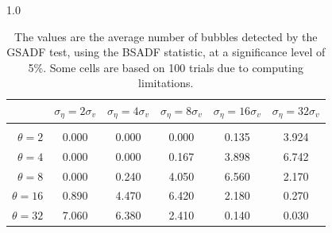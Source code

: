 \documentclass[12pt]{article}
\begin{document}
\begin{table}[h!]
\vspace{10pt}
\begin{subtable}{1.0\textwidth}
    \centering
\begin{tabular}{rccccc}
\hline  
            & \multicolumn{1}{l}{$\sigma_{\eta} =2\sigma_{v}$} & \multicolumn{1}{l}{$\sigma_{\eta} =4\sigma_{v}$} & \multicolumn{1}{l}{$\sigma_{\eta} =8\sigma_{v}$} & \multicolumn{1}{l}{$\sigma_{\eta} =16\sigma_{v}$} & \multicolumn{1}{l}{$\sigma_{\eta} =32\sigma_{v}$} \\ \hline  \vspace{-3mm} \\        
$\theta=2$             & 0.000   & 0.000   & 0.000   & 0.135    & 3.924    \\ \hline
$\theta=4$             & 0.000   & 0.000   & 0.167   & 3.898    & 6.742    \\ \hline
$\theta=8$             & 0.000   & 0.240   & 4.050   & 6.560    & 2.170    \\ \hline
$\theta=16$            & 0.890   & 4.470   & 6.420   & 2.180    & 0.270    \\ \hline
$\theta=32$            & 7.060   & 6.380   & 2.410   & 0.140    & 0.030    \\ \hline
\end{tabular}
\end{subtable}
\caption{The values are the average number of bubbles detected by the GSADF test, using the BSADF statistic, at a significance level of 5\%. Some cells are based on 100 trials due to computing limitations.}
\label{bubcount GSADFsamps}
\end{table}

\pagebreak
\singlespacing
\setlength{}
\printbibliography
\end{document}
